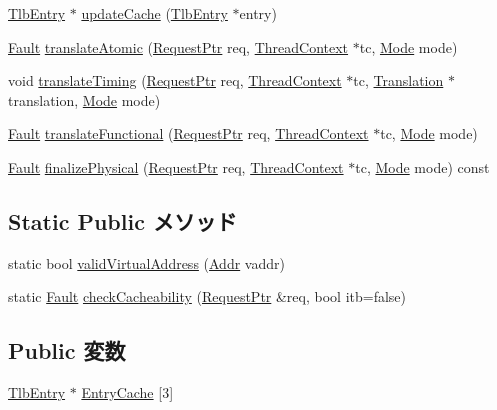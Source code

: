 \begin{DoxyCompactItemize}
\item 
\hyperlink{structAlphaISA_1_1TlbEntry}{TlbEntry} $\ast$ \hyperlink{classAlphaISA_1_1TLB_a5d6ff82bfde528ed0663afc4a718a5a1}{updateCache} (\hyperlink{structAlphaISA_1_1TlbEntry}{TlbEntry} $\ast$entry)
\item 
\hyperlink{classRefCountingPtr}{Fault} \hyperlink{classAlphaISA_1_1TLB_ad54e01e3c0a1613098a76b7f92e5be93}{translateAtomic} (\hyperlink{classRequest}{RequestPtr} req, \hyperlink{classThreadContext}{ThreadContext} $\ast$tc, \hyperlink{classBaseTLB_a46c8a310cf4c094f8c80e1cb8dc1f911}{Mode} mode)
\item 
void \hyperlink{classAlphaISA_1_1TLB_ae52f7e465748883695d2b4f432a13652}{translateTiming} (\hyperlink{classRequest}{RequestPtr} req, \hyperlink{classThreadContext}{ThreadContext} $\ast$tc, \hyperlink{classBaseTLB_1_1Translation}{Translation} $\ast$translation, \hyperlink{classBaseTLB_a46c8a310cf4c094f8c80e1cb8dc1f911}{Mode} mode)
\item 
\hyperlink{classRefCountingPtr}{Fault} \hyperlink{classAlphaISA_1_1TLB_a26658814c6c9034665aae19cf25545bb}{translateFunctional} (\hyperlink{classRequest}{RequestPtr} req, \hyperlink{classThreadContext}{ThreadContext} $\ast$tc, \hyperlink{classBaseTLB_a46c8a310cf4c094f8c80e1cb8dc1f911}{Mode} mode)
\item 
\hyperlink{classRefCountingPtr}{Fault} \hyperlink{classAlphaISA_1_1TLB_ae199d95c42e036851a8a0543c6d6d2e3}{finalizePhysical} (\hyperlink{classRequest}{RequestPtr} req, \hyperlink{classThreadContext}{ThreadContext} $\ast$tc, \hyperlink{classBaseTLB_a46c8a310cf4c094f8c80e1cb8dc1f911}{Mode} mode) const 
\end{DoxyCompactItemize}
\subsection*{Static Public メソッド}
\begin{DoxyCompactItemize}
\item 
static bool \hyperlink{classAlphaISA_1_1TLB_a3e576c3e0d39dfca708baea44ebf0617}{validVirtualAddress} (\hyperlink{classm5_1_1params_1_1Addr}{Addr} vaddr)
\item 
static \hyperlink{classRefCountingPtr}{Fault} \hyperlink{classAlphaISA_1_1TLB_ae6e8469121a70e90e8213987b19eb83d}{checkCacheability} (\hyperlink{classRequest}{RequestPtr} \&req, bool itb=false)
\end{DoxyCompactItemize}
\subsection*{Public 変数}
\begin{DoxyCompactItemize}
\item 
\hyperlink{structAlphaISA_1_1TlbEntry}{TlbEntry} $\ast$ \hyperlink{classAlphaISA_1_1TLB_a82eefd07de8b39b6a974a2b03174999a}{EntryCache} \mbox{[}3\mbox{]}
\end{DoxyCompactItemize}
